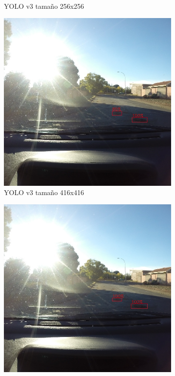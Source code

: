\begin{figure}[H]
\begin{subfigure}[h]{0.45\linewidth}
		\caption{YOLO v3 tamaño 256x256}
	\end{subfigure}
	\begin{subfigure}[h]{0.45\linewidth}
		\includegraphics[width=\linewidth]{images/results_d_yolo_v3_416.jpg}
		\caption{YOLO v3 tamaño 416x416}
	\end{subfigure}
	\begin{subfigure}[h]{0.45\linewidth}
		\includegraphics[width=\linewidth]{images/results_d_yolo_v3_640.jpg}

\end{subfigure}
\end{figure}

